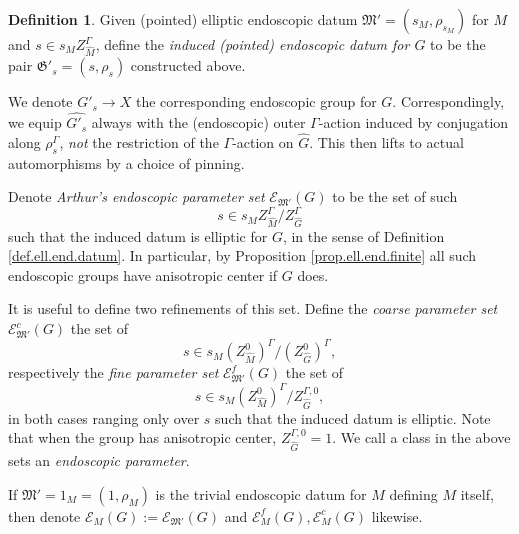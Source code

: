 \documentclass[openany]{amsbook}
\theoremstyle{definition}
\newtheorem{definition}[theorem]{Definition}
\theoremstyle{remark}
\numberwithin{equation}{section}
\newcommand{\cE}{\mathcal{E}}
\renewcommand{\-}{\operatorname{-}}
\newcommand{\fM}{\mathfrak{M}}
\newcommand{\fG}{\mathfrak{G}}
\begin{document}
\begin{definition}\label{def.induced.end.datum}
    Given (pointed) elliptic endoscopic datum $\fM'=(s_M, \rho_{s_M})$ for $M$ and $s \in s_M Z_{\widehat{M}}^{\Gamma}$, define the \textit{induced (pointed) endoscopic datum for $G$} to be the pair $\fG'_s = (s, \rho_s)$ constructed above.
    
    We denote $G'_s \to X$ the corresponding endoscopic group for $G$. Correspondingly, we equip $\widehat{G'_s}$ always with the (endoscopic) outer $\Gamma$-action induced by conjugation along $\rho_s^{\Gamma}$, \emph{not} the restriction of the $\Gamma$-action on $\widehat{G}$. This then lifts to actual automorphisms by a choice of pinning.
    
    Denote \emph{Arthur's endoscopic parameter set} $\cE_{\fM'}(G)$ to be the set of such $$s \in s_M Z_{\widehat{M}}^{\Gamma}/Z_{\widehat{G}}^{\Gamma}$$ such that the induced datum is elliptic for $G$, in the sense of Definition \ref{def.ell.end.datum}. In particular, by Proposition \ref{prop.ell.end.finite} all such endoscopic groups have anisotropic center if $G$ does. 

    It is useful to define two refinements of this set. Define the \emph{coarse parameter set} $\cE_{\fM'}^c(G)$ the set of
    $$
        s \in s_M (Z_{\widehat{M}}^0)^{\Gamma}/(Z_{\widehat{G}}^0)^{\Gamma},
    $$
    respectively the \emph{fine parameter set} $\cE_{\fM'}^f(G)$ the set of
    $$
        s \in s_M (Z_{\widehat{M}}^0)^{\Gamma}/Z_{\widehat{G}}^{\Gamma,0},
    $$
    in both cases ranging only over $s$ such that the induced datum is elliptic. Note that when the group has anisotropic center, $Z_{\widehat{G}}^{\Gamma,0} = 1$. We call a class in the above sets an \emph{endoscopic parameter}.

    If $\fM' = 1_M = (1, \rho_M)$ is the trivial endoscopic datum for $M$ defining $M$ itself, then denote $\cE_{M}(G) := \cE_{\fM'}(G)$ and $\cE_{M}^f(G), \cE_M^c(G)$ likewise.
\end{definition}
\end{document}
